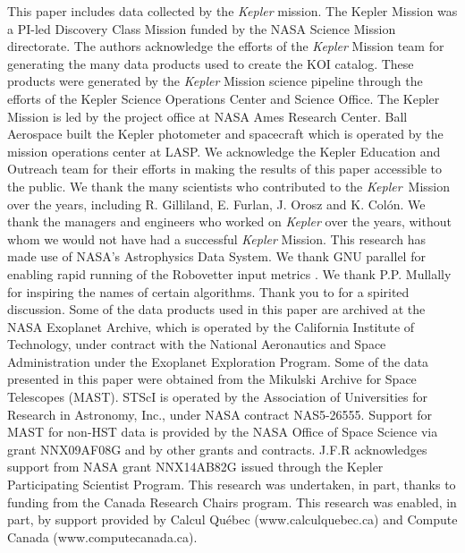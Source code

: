 \documentclass[twocolumn,tighten]{aastex61}
\renewcommand{\_}{\discretionary{\underscore}{}{\underscore}}  %
\newcommand\Kepler{\textit{Kepler}}
\begin{document}











\acknowledgments

This paper includes data collected by the \Kepler{} mission. The Kepler Mission was a PI-led Discovery Class Mission funded by the NASA Science Mission directorate. The authors acknowledge the efforts of the \Kepler{} Mission team for generating the many data products used to create the KOI catalog. These products were generated by the \Kepler{} Mission science pipeline through the efforts of the Kepler Science Operations Center and Science Office. The Kepler Mission is led by the project office at NASA Ames Research Center. Ball Aerospace built the Kepler photometer and spacecraft which is operated by the mission operations center at LASP.  
We acknowledge the Kepler Education and Outreach team for their efforts in making the results of this paper accessible to the public. We thank the many scientists who contributed to the \Kepler\ Mission over the years, including R. Gilliland, E. Furlan, J. Orosz and K. Col\'{o}n. We thank the managers and engineers who worked on \Kepler{} over the years, without whom we would not have had a successful \Kepler{} Mission. This research has made use of NASA's Astrophysics Data System. We thank GNU parallel for enabling rapid running of the Robovetter input metrics \citep{Tange2011a}. We thank P.P. Mullally for inspiring the names of certain algorithms. Thank you to \citet{Turbo-King2017} for a spirited discussion.
Some of the data products used in this paper are archived at the NASA Exoplanet Archive, which is operated by the California Institute of Technology, under contract with the National Aeronautics and Space Administration under the Exoplanet Exploration Program. Some of the data presented in this paper were obtained from the Mikulski Archive for Space Telescopes (MAST). STScI is operated by the Association of Universities for Research in Astronomy, Inc., under NASA contract NAS5-26555. Support for MAST for non-HST data is provided by the NASA Office of Space Science via grant NNX09AF08G and by other grants and contracts.  J.F.R acknowledges support from NASA grant NNX14AB82G issued through the Kepler Participating Scientist Program. This research was undertaken, in part, thanks to funding from the Canada Research Chairs program. This research was enabled, in part, by support provided by Calcul Qu\'{e}bec (www.calculquebec.ca) and Compute Canada (www.computecanada.ca). 
\end{document}
